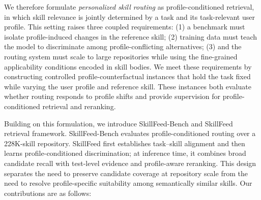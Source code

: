 \documentclass[letterpaper]{article} %
\begin{document}

We therefore formulate \emph{personalized skill routing} as profile-conditioned retrieval, in which skill relevance is jointly determined by a task and its task-relevant user profile. This setting raises three coupled requirements: (1) a benchmark must isolate profile-induced changes in the reference skill; (2) training data must teach the model to discriminate among profile-conflicting alternatives; (3) and the routing system must scale to large repositories while using the fine-grained applicability conditions encoded in skill bodies. 
We meet these requirements by constructing controlled profile-counterfactual instances that hold the task fixed while varying the user profile and reference skill. These instances both evaluate whether routing responds to profile shifts and provide supervision for profile-conditioned retrieval and reranking.

Building on this formulation, we introduce SkillFeed-Bench and SkillFeed retrieval framework. SkillFeed-Bench evaluates profile-conditioned routing over a 228K-skill repository. SkillFeed first establishes task--skill alignment and then learns profile-conditioned discrimination; at inference time, it combines broad candidate recall with test-level evidence and profile-aware reranking. This design separates the need to preserve candidate coverage at repository scale from the need to resolve profile-specific suitability among semantically similar skills. Our contributions are as follows:
\end{document}
